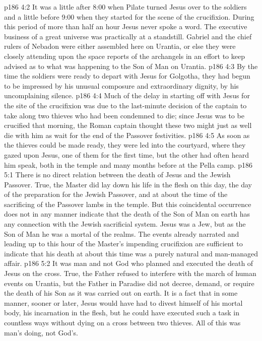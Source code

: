 \vs p186 4:2 It was a little after 8:00 when Pilate turned Jesus over to the soldiers and a little before 9:00 when they started for the scene of the crucifixion. During this period of more than half an hour Jesus never spoke a word. The executive business of a great universe was practically at a standstill. Gabriel and the chief rulers of Nebadon were either assembled here on Urantia, or else they were closely attending upon the space reports of the archangels in an effort to keep advised as to what was happening to the Son of Man on Urantia.
\vs p186 4:3 By the time the soldiers were ready to depart with Jesus for Golgotha, they had begun to be impressed by his unusual composure and extraordinary dignity, by his uncomplaining silence.
\vs p186 4:4 Much of the delay in starting off with Jesus for the site of the crucifixion was due to the last\hyp{}minute decision of the captain to take along two thieves who had been condemned to die; since Jesus was to be crucified that morning, the Roman captain thought these two might just as well die with him as wait for the end of the Passover festivities.
\vs p186 4:5 As soon as the thieves could be made ready, they were led into the courtyard, where they gazed upon Jesus, one of them for the first time, but the other had often heard him speak, both in the temple and many months before at the Pella camp.
\vs p186 5:1 There is no direct relation between the death of Jesus and the Jewish Passover. True, the Master did lay down his life in the flesh on this day, the day of the preparation for the Jewish Passover, and at about the time of the sacrificing of the Passover lambs in the temple. But this coincidental occurrence does not in any manner indicate that the death of the Son of Man on earth has any connection with the Jewish sacrificial system. Jesus was a Jew, but as the Son of Man he was a mortal of the realms. The events already narrated and leading up to this hour of the Master’s impending crucifixion are sufficient to indicate that his death at about this time was a purely natural and man\hyp{}managed affair.
\vs p186 5:2 It was man and not God who planned and executed the death of Jesus on the cross. True, the Father refused to interfere with the march of human events on Urantia, but the Father in Paradise did not decree, demand, or require the death of his Son as it was carried out on earth. It is a fact that in some manner, sooner or later, Jesus would have had to divest himself of his mortal body, his incarnation in the flesh, but he could have executed such a task in countless ways without dying on a cross between two thieves. All of this was man’s doing, not God’s.
